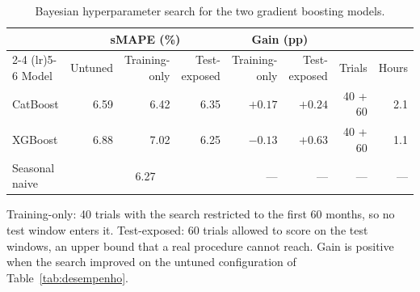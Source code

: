 \begin{table}[htbp]
\centering
\small
\setlength{\tabcolsep}{4pt}
\caption{Bayesian hyperparameter search for the two gradient boosting models.}
\label{tab:optuna}
\begin{tabular}{lrrrrrrr}
\toprule
& \multicolumn{3}{c}{sMAPE (\%)} & \multicolumn{2}{c}{Gain (pp)} & & \\
\cmidrule(lr){2-4} \cmidrule(lr){5-6}
Model & Untuned & Training-only & Test-exposed & Training-only & Test-exposed & Trials & Hours \\
\midrule
CatBoost & 6.59 & 6.42 & 6.35 & $+0.17$ & $+0.24$ & 40 + 60 & 2.1 \\
XGBoost & 6.88 & 7.02 & 6.25 & $-0.13$ & $+0.63$ & 40 + 60 & 1.1 \\
\midrule
Seasonal naive & \multicolumn{3}{c}{6.27} & --- & --- & --- & --- \\
\bottomrule
\end{tabular}

\vspace{0.5em}
\begin{minipage}{\textwidth}
\footnotesize
Training-only: 40 trials with the search restricted to the first 60 months, so no test window enters it. Test-exposed: 60 trials allowed to score on the test windows, an upper bound that a real procedure cannot reach. Gain is positive when the search improved on the untuned configuration of Table~\ref{tab:desempenho}.
\end{minipage}
\end{table}
